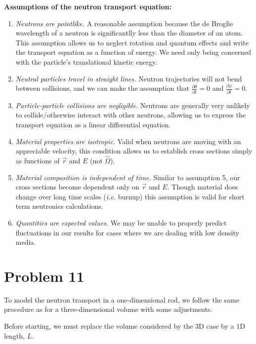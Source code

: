 \documentclass{article}
\newcommand{\Oh}{\hat{\Omega}}
\begin{document}
\textbf{Assumptions of the neutron transport equation:}
\begin{enumerate}
	\item \textit{Neutrons are pointlike.} A reasonable assumption because the de Broglie wavelength of a neutron is significantlly less than the diameter of an atom. This assumption allows us to neglect rotation and quantum effects and write the transport equation as a function of energy. We need only being concerned with the particle's translational kinetic energy.
	\item \textit{Neutral particles travel in straight lines.} Neutron trajectories will not bend between collisions, and we can make the assumption that $\frac{\partial \theta}{\partial t} = 0$ and $\frac{\partial \varphi}{\partial t} = 0$.
	\item \textit{Particle-particle collisions are negligible.} Neutrons are generally very unlikely to collide/otherwise interact with other neutrons, allowing us to express the transport equation as a linear differential equation.
	\item \textit{Material properties are isotropic.} Valid when neutrons are moving with an appreciable velocity, this condition allows us to establish cross sections simply as functions of $\vec{r}$ and $E$ (not $\Oh$).
	\item \textit{Material composition is independent of time.} Similar to assumption 5, our cross sections become dependent only on $\vec{r}$ and $E$. Though material does change over long time scales (\textit{i.e.} burnup) this assumption is valid for short term neutronics calculations.
	\item \textit{Quantities are expected values.} We may be unable to properly predict fluctuations in our results for cases where we are dealing with low density media.

\end{enumerate}




\section*{Problem 11}

To model the neutron transport in a one-dimensional rod, we follow the same procedure as for a three-dimensional volume with some adjustments.

Before starting, we must replace the volume considered by the 3D case by a 1D length, $L$. 
\end{document}
